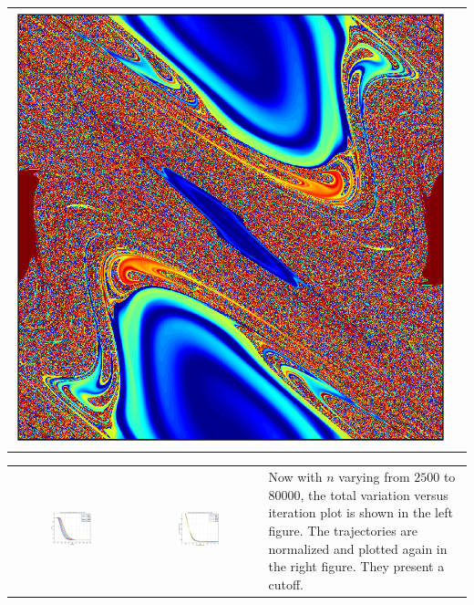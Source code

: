 \documentclass[landscape,a0b,final]{a0poster}
\newenvironment{poster}{
  \begin{center}
  \begin{minipage}[c]{0.98\textwidth}
}{
  \end{minipage} 
  \end{center}
}
\newenvironment{pcolumn}[1]{
  \begin{minipage}{#1\textwidth}
  \begin{center}
}{
  \end{center}
  \end{minipage}
}
\begin{document}
\begin{poster}
\begin{center}
\begin{pcolumn}{0.32}
{\begin{tabular}{c|c}
\begin{minipage}[s]{0.33\hsize}
 \centerline{\includegraphics[scale=0.6,angle=90]{standardmapsimuexact2.eps}}
   \end{minipage} 
\end{tabular}



\begin{tabular}{cc|l}
   
        \includegraphics[width=0.35\textwidth,trim=0cm 0cm 0cm 0cm]{standardmapcutoff}&
	\includegraphics[width=0.35\textwidth,trim=0cm 0cm 0cm 0cm]{standardmapcutoffn}&
   \begin{minipage}[b]{0.28\hsize}
    Now with $n$ varying from $2500$ to $80000$, the total variation versus iteration plot is shown in the left figure. The  trajectories are normalized and plotted again in the right figure. They present a cutoff.
    \end{minipage} 
\end{tabular}


}
\end{pcolumn}
\end{center}
\end{poster}
\end{document}
